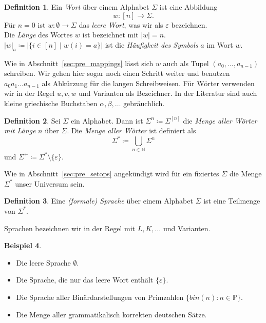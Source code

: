 \documentclass[11pt, a4paper]{article}
\theoremstyle{definition}
\newtheorem{definition}{Definition}[section]
\newtheorem{example}[definition]{Beispiel}
\theoremstyle{plain}
\numberwithin{equation}{section}
\begin{document}
\begin{definition}
	Ein \textit{Wort} über einem Alphabet \( \Sigma \) ist eine Abbildung
	\[
		w\colon [n] \to \Sigma.
	\]
	Für \( n = 0 \) ist \( w\colon \emptyset \to \Sigma \) das \textit{leere Wort}, was wir als \( \varepsilon \) bezeichnen.\\
	Die \textit{Länge} des Wortes \( w \) ist bezeichnet mit \( \left| w \right| = n \).\\
	\( \left| w \right|_a \coloneqq \left| \{ i \in [n] \mid w(i) = a \} \right| \) ist die \textit{Häufigkeit des Symbols} \( a \) im Wort \( w \).
\end{definition}
Wie in Abschnitt~\ref{sec:pre_mappings} lässt sich \( w \) auch als Tupel \( (a_0, \ldots, a_{n-1}) \) schreiben. Wir gehen hier sogar noch einen Schritt weiter und benutzen \( a_0 a_1 \ldots a_{n-1} \) als Abkürzung für die langen Schreibweisen. Für Wörter verwenden wir in der Regel \( u, v, w \) und Varianten als Bezeichner. In der Literatur sind auch kleine griechische Buchstaben \( \alpha, \beta, \ldots \) gebräuchlich.
\begin{definition}
	Sei \( \Sigma \) ein Alphabet. Dann ist \( \Sigma^n \coloneqq \Sigma^{[n]} \) die \textit{Menge aller Wörter mit Länge} \( n \) über \( \Sigma \).
	Die \textit{Menge aller Wörter} ist definiert als
	\[
		\Sigma^\ast \coloneqq \bigcup_{n \in \mathbb{N}} \Sigma^n
	\]
	und \( \Sigma^+ \coloneqq \Sigma^\ast \setminus \{ \varepsilon \} \).
\end{definition}
Wie in Abschnitt~\ref{sec:pre_setops} angekündigt wird für ein fixiertes \( \Sigma \) die Menge \( \Sigma^\ast \) unser Universum sein.
\begin{definition}
	Eine \textit{(formale) Sprache} über einem Alphabet \( \Sigma \) ist eine Teilmenge von \( \Sigma^\ast \).
\end{definition}
Sprachen bezeichnen wir in der Regel mit \( L, K, \ldots \) und Varianten.
\begin{example}
	\
	\begin{itemize}
		\item Die leere Sprache \( \emptyset \).
		\item Die Sprache, die nur das leere Wort enthält \( \{ \varepsilon \} \).
		\item Die Sprache aller Binärdarstellungen von Primzahlen \( \{ bin(n) : n \in \mathbb{P} \} \).
		\item Die Menge aller grammatikalisch korrekten deutschen Sätze.
	\end{itemize}
\end{example}
\end{document}
